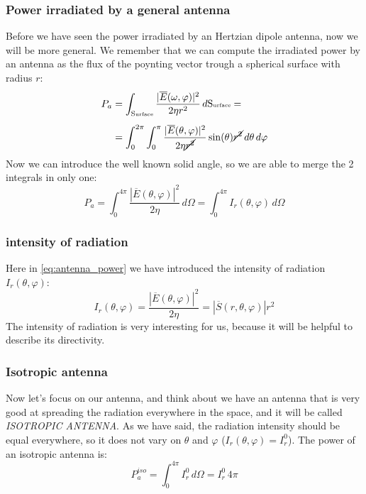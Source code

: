 \subsubsection*{Power irradiated by a general antenna}
Before we have seen the power irradiated by an Hertzian dipole antenna, now we will be more general. We remember that we can compute the irradiated power by an antenna as the flux of the poynting vector trough a spherical surface with radius $r$:
\begin{align}
    \begin{split}
        P_a&=\int_{\text{S\tiny{urface}}}\frac{|\overline{E}(\omega,\varphi)|^2}{2\eta r^2}\,d\text{S\tiny{urface}}=\\[5pt]
        &=\int_0^{2\pi}\int_0^\pi \frac{|\overline{E}(\theta,\varphi)|^2}{2\eta\cancel{r^2}}\sin(\theta)\cancel{r^2}\,d\theta\,d\varphi
    \end{split}
\end{align}
Now we can introduce the well known solid angle, so we are able to merge the 2 integrals in only one:
\begin{equation}\label{eq:antenna_power}
    P_a=\int_0^{4\pi}\frac{|\overline{E}(\theta,\varphi)|^2}{2\eta}\,d\Omega=\int_0^{4\pi}I_r(\theta,\varphi)\,d\Omega
\end{equation}
\subsubsection*{intensity of radiation}
Here in \cref{eq:antenna_power} we have introduced the intensity of radiation $I_r(\theta,\varphi)$:
\begin{equation}\label{eq:radiation_intensity}
    I_r(\theta,\varphi)=\frac{|\overline{E}(\theta,\varphi)|^2}{2\eta}=|\overline{S}(r,\theta,\varphi)|r^2
\end{equation}
The intensity of radiation is very interesting for us, because it will be helpful to describe its directivity.
\subsubsection*{Isotropic antenna}
Now let's focus on our antenna, and think about we have an antenna that is very good at spreading the radiation everywhere in the space, and it will be called \emph{ISOTROPIC ANTENNA}. As we have said, the radiation intensity should be equal everywhere, so it does not vary on $\theta$ and $\varphi$ ($I_r(\theta,\varphi)=I_r^0$). The power of an isotropic antenna is:
\begin{equation}\label{eq:power_isotropic_antenna}
    P_a^{iso}=\int_0^{4\pi}I^0_r\,d\Omega=I^0_r\,4\pi
\end{equation}
